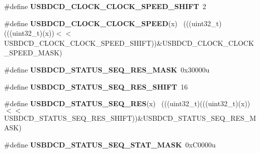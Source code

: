 \begin{DoxyCompactItemize}
\item 
\hypertarget{group___u_s_b_d_c_d___register___masks_gaa1667808247c5b8355c58b93a4e80c8a}{}\#define {\bfseries U\+S\+B\+D\+C\+D\+\_\+\+C\+L\+O\+C\+K\+\_\+\+C\+L\+O\+C\+K\+\_\+\+S\+P\+E\+E\+D\+\_\+\+S\+H\+I\+F\+T}~2\label{group___u_s_b_d_c_d___register___masks_gaa1667808247c5b8355c58b93a4e80c8a}

\item 
\hypertarget{group___u_s_b_d_c_d___register___masks_gab612fd6bc4a6d4ebb440f33c4f0561b7}{}\#define {\bfseries U\+S\+B\+D\+C\+D\+\_\+\+C\+L\+O\+C\+K\+\_\+\+C\+L\+O\+C\+K\+\_\+\+S\+P\+E\+E\+D}(x)                        ~(((uint32\+\_\+t)(((uint32\+\_\+t)(x))$<$$<$U\+S\+B\+D\+C\+D\+\_\+\+C\+L\+O\+C\+K\+\_\+\+C\+L\+O\+C\+K\+\_\+\+S\+P\+E\+E\+D\+\_\+\+S\+H\+I\+F\+T))\&U\+S\+B\+D\+C\+D\+\_\+\+C\+L\+O\+C\+K\+\_\+\+C\+L\+O\+C\+K\+\_\+\+S\+P\+E\+E\+D\+\_\+\+M\+A\+S\+K)\label{group___u_s_b_d_c_d___register___masks_gab612fd6bc4a6d4ebb440f33c4f0561b7}

\item 
\hypertarget{group___u_s_b_d_c_d___register___masks_gaa1c55980f5e31bfe02a2f4bc3bcf753d}{}\#define {\bfseries U\+S\+B\+D\+C\+D\+\_\+\+S\+T\+A\+T\+U\+S\+\_\+\+S\+E\+Q\+\_\+\+R\+E\+S\+\_\+\+M\+A\+S\+K}~0x30000u\label{group___u_s_b_d_c_d___register___masks_gaa1c55980f5e31bfe02a2f4bc3bcf753d}

\item 
\hypertarget{group___u_s_b_d_c_d___register___masks_ga4d1d707ac9f9afb0b114a4032951971d}{}\#define {\bfseries U\+S\+B\+D\+C\+D\+\_\+\+S\+T\+A\+T\+U\+S\+\_\+\+S\+E\+Q\+\_\+\+R\+E\+S\+\_\+\+S\+H\+I\+F\+T}~16\label{group___u_s_b_d_c_d___register___masks_ga4d1d707ac9f9afb0b114a4032951971d}

\item 
\hypertarget{group___u_s_b_d_c_d___register___masks_ga283c30df592d96d824cab96f6b9bbeee}{}\#define {\bfseries U\+S\+B\+D\+C\+D\+\_\+\+S\+T\+A\+T\+U\+S\+\_\+\+S\+E\+Q\+\_\+\+R\+E\+S}(x)                              ~(((uint32\+\_\+t)(((uint32\+\_\+t)(x))$<$$<$U\+S\+B\+D\+C\+D\+\_\+\+S\+T\+A\+T\+U\+S\+\_\+\+S\+E\+Q\+\_\+\+R\+E\+S\+\_\+\+S\+H\+I\+F\+T))\&U\+S\+B\+D\+C\+D\+\_\+\+S\+T\+A\+T\+U\+S\+\_\+\+S\+E\+Q\+\_\+\+R\+E\+S\+\_\+\+M\+A\+S\+K)\label{group___u_s_b_d_c_d___register___masks_ga283c30df592d96d824cab96f6b9bbeee}

\item 
\hypertarget{group___u_s_b_d_c_d___register___masks_gad49d469540afee62a5a62a5419d89cf2}{}\#define {\bfseries U\+S\+B\+D\+C\+D\+\_\+\+S\+T\+A\+T\+U\+S\+\_\+\+S\+E\+Q\+\_\+\+S\+T\+A\+T\+\_\+\+M\+A\+S\+K}~0x\+C0000u\label{group___u_s_b_d_c_d___register___masks_gad49d469540afee62a5a62a5419d89cf2}


\end{DoxyCompactItemize}
